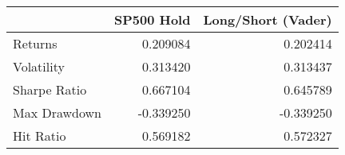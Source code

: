 \begin{tabular}{lrr}
\toprule
{} &  SP500 Hold &  Long/Short (Vader) \\
\midrule
Returns      &    0.209084 &            0.202414 \\
Volatility   &    0.313420 &            0.313437 \\
Sharpe Ratio &    0.667104 &            0.645789 \\
Max Drawdown &   -0.339250 &           -0.339250 \\
Hit Ratio    &    0.569182 &            0.572327 \\
\bottomrule
\end{tabular}
